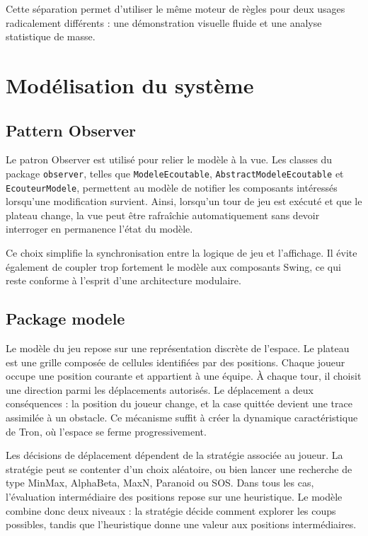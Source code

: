 \documentclass[11pt,a4paper]{article}
\begin{document}
Cette séparation permet d'utiliser le même moteur de règles pour deux usages radicalement différents : une démonstration visuelle fluide et une analyse statistique de masse.


\section{Modélisation du système}

\subsection{Pattern Observer}

Le patron Observer est utilisé pour relier le modèle à la vue. Les classes du package \texttt{observer}, telles que \texttt{ModeleEcoutable}, \texttt{AbstractModeleEcoutable} et \texttt{EcouteurModele}, permettent au modèle de notifier les composants intéressés lorsqu'une modification survient. Ainsi, lorsqu'un tour de jeu est exécuté et que le plateau change, la vue peut être rafraîchie automatiquement sans devoir interroger en permanence l'état du modèle.

Ce choix simplifie la synchronisation entre la logique de jeu et l'affichage. Il évite également de coupler trop fortement le modèle aux composants Swing, ce qui reste conforme à l'esprit d'une architecture modulaire.


\subsection{Package modele}

Le modèle du jeu repose sur une représentation discrète de l'espace. Le plateau est une grille composée de cellules identifiées par des positions. Chaque joueur occupe une position courante et appartient à une équipe. À chaque tour, il choisit une direction parmi les déplacements autorisés. Le déplacement a deux conséquences : la position du joueur change, et la case quittée devient une trace assimilée à un obstacle. Ce mécanisme suffit à créer la dynamique caractéristique de Tron, où l'espace se ferme progressivement.

Les décisions de déplacement dépendent de la stratégie associée au joueur. La stratégie peut se contenter d'un choix aléatoire, ou bien lancer une recherche de type MinMax, AlphaBeta, MaxN, Paranoid ou SOS. Dans tous les cas, l'évaluation intermédiaire des positions repose sur une heuristique. Le modèle combine donc deux niveaux : la stratégie décide comment explorer les coups possibles, tandis que l'heuristique donne une valeur aux positions intermédiaires.
\end{document}
